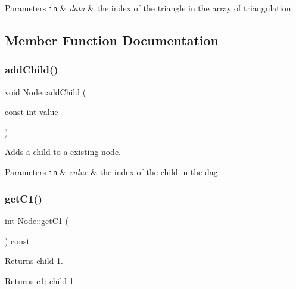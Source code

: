 \begin{DoxyParams}[1]{Parameters}
\mbox{\tt in}  & {\em data} & the index of the triangle in the array of triangulation \\
\hline
\end{DoxyParams}


\subsection{Member Function Documentation}
\mbox{\label{classNode_a0534fe9af130ed888e44f9c9b2a8144d}} 
\subsubsection{\texorpdfstring{add\+Child()}{addChild()}}
{\footnotesize\ttfamily void Node\+::add\+Child (\begin{DoxyParamCaption}\item[{const int}]{value }\end{DoxyParamCaption})}



Adds a child to a existing node. 


\begin{DoxyParams}[1]{Parameters}
\mbox{\tt in}  & {\em value} & the index of the child in the dag \\
\hline
\end{DoxyParams}
\mbox{\label{classNode_a9c32461ac040d49aff5d25b41b0353a7}} 
\subsubsection{\texorpdfstring{get\+C1()}{getC1()}}
{\footnotesize\ttfamily int Node\+::get\+C1 (\begin{DoxyParamCaption}{ }\end{DoxyParamCaption}) const}



Returns child 1. 

\begin{DoxyReturn}{Returns}
c1\+: child 1 
\end{DoxyReturn}
\mbox{\label{classNode_aea950a9a2d050dc1aa571a5282c8b410}} 
